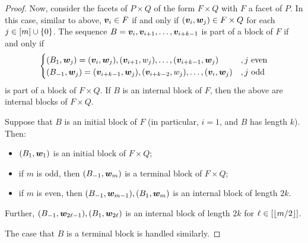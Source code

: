 \begin{proof}
Now, consider the facets of \(P\times Q\) of the form \(F\times Q\) with \(F\) a facet of \(P\).  In this case, similar to above, \(\bm{v}_i\in F\) if and only if \((\bm{v}_i,\bm{w}_j)\in F\times Q\) for each \(j\in\left[m\right]\cup\left\{0\right\}\).  The sequence \(B=\bm{v}_i,\bm{v}_{i+1},\dotsc,\bm{v}_{i+k-1}\) is part of a block of \(F\) if and only if
    \begin{align*}
        \begin{cases}
            (B_1,\bm{w}_j)=
                (\bm{v}_i,\bm{w}_j),(\bm{v}_{i+1},w_j),\dotsc, (\bm{v}_{i+k-1},\bm{w}_j)
                    &   ,j\text{ even}\\
            (B_{-1},\bm{w}_j)=
                (\bm{v}_{i+k-1},\bm{w}_j),(\bm{v}_{i+k-2},w_j),\dotsc,(\bm{v}_i,\bm{w}_j)
                    &   ,j\text{ odd}\\
        \end{cases}
    \end{align*}
is part of a block of \(F\times Q\).  If \(B\) is an internal block of \(F\), then the above are internal blocks of \(F\times Q\).

Suppose that \(B\) is an initial block of \(F\) (in particular, \(i=1\), and \(B\) has length \(k\)).  Then:
    \begin{itemize}
        \item   \((B_1,\bm{w}_1)\) is an initial block of \(F\times Q\);
        \item   if \(m\) is odd, then \((B_{-1},\bm{w}_m)\) is a terminal block of \(F\times Q\);
        \item   if \(m\) is even, then \((B_{-1},\bm{w}_{m-1}),(B_1,\bm{w}_m)\) is an internal block of length \(2k\).
    \end{itemize}
Further, \((B_{-1},\bm{w}_{2\ell-1}),(B_1,\bm{w}_{2\ell})\) is an internal block of length \(2k\) for \(\ell\in\left[\left\lfloor m/2\right\rfloor\right]\).

The case that \(B\) is a terminal block is handled similarly.
\end{proof} 